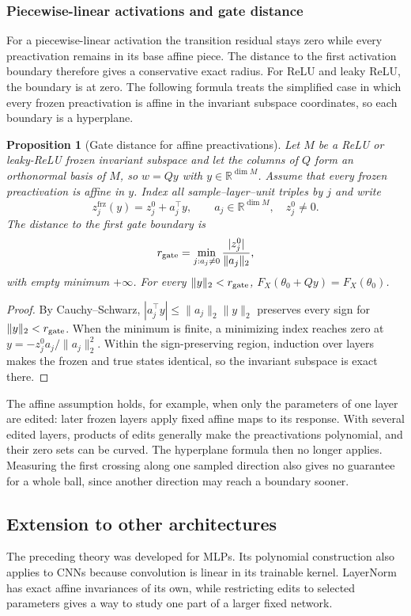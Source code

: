 \documentclass[twoside]{article}
\newtheorem{proposition}[theorem]{Proposition}
\theoremstyle{remark}
\newcommand{\R}{\mathbb R}
\newcommand{\frz}{\mathrm{frz}}
\theoremstyle{highlightdefinition}
\theoremstyle{remark}
\begin{document}
\subsubsection{Piecewise-linear activations and gate distance}
For a piecewise-linear activation the transition residual stays zero while every preactivation remains in its base affine piece. The distance to the first activation boundary therefore gives a conservative exact radius. For ReLU and leaky ReLU, the boundary is at zero. The following formula treats the simplified case in which every frozen preactivation is affine in the invariant subspace coordinates, so each boundary is a hyperplane.
\begin{proposition}[Gate distance for affine preactivations]
Let $M$ be a ReLU or leaky-ReLU frozen invariant subspace and let the columns of $Q$ form an orthonormal basis of $M$, so $w=Qy$ with $y\in\R^{\dim M}$. Assume that every frozen preactivation is affine in $y$. Index all sample--layer--unit triples by $j$ and write
\[
 z_j^{\frz}(y)=z_j^0+a_j^\top y,\qquad a_j\in\R^{\dim M},\quad z_j^0\ne0.
\]
The distance to the first gate boundary is
\[
 r_{\rm gate}=\min_{j:a_j\ne0}\frac{|z_j^0|}{\|a_j\|_2},
\]
with empty minimum $+\infty$. For every $\|y\|_2<r_{\rm gate}$, $F_X(\theta_0+Qy)=F_X(\theta_0)$.
\end{proposition}
\begin{proof}
By Cauchy--Schwarz, $|a_j^\top y|\le\|a_j\|_2\|y\|_2$ preserves every sign for $\|y\|_2<r_{\rm gate}$. When the minimum is finite, a minimizing index reaches zero at $y=-z_j^0a_j/\|a_j\|_2^2$. Within the sign-preserving region, induction over layers makes the frozen and true states identical, so the invariant subspace is exact there.
\end{proof}
The affine assumption holds, for example, when only the parameters of one layer are edited: later frozen layers apply fixed affine maps to its response. With several edited layers, products of edits generally make the preactivations polynomial, and their zero sets can be curved. The hyperplane formula then no longer applies. Measuring the first crossing along one sampled direction also gives no guarantee for a whole ball, since another direction may reach a boundary sooner.





\subsection{Extension to other architectures}\label{app:architectures}
The preceding theory was developed for MLPs. Its polynomial construction also applies to CNNs because convolution is linear in its trainable kernel. LayerNorm has exact affine invariances of its own, while restricting edits to selected parameters gives a way to study one part of a larger fixed network.
\end{document}

